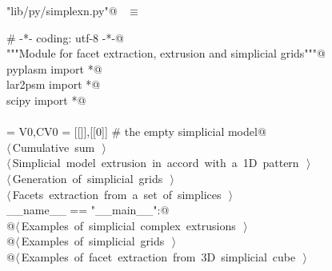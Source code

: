 \documentclass[11pt,oneside]{article}	%
\begin{document}
\begin{flushleft} \small
\begin{minipage}{\linewidth} \label{scrap10}
\verb@"lib/py/simplexn.py"@\nobreak\ {\footnotesize {} }$\equiv$
\vspace{-1ex}
\begin{list}{}{} \item
\mbox{}\verb@# -*- coding: utf-8 -*-@\\
\mbox{}\verb@"""Module for facet extraction, extrusion and simplicial grids"""@\\
\mbox{}\verb@from pyplasm import *@\\
\mbox{}\verb@from lar2psm import *@\\
\mbox{}\verb@from scipy import *@\\
\mbox{}\verb@@\\
\mbox{}\verb@VOID = V0,CV0 = [[]],[[0]]    # the empty simplicial model@\\
\mbox{}\verb@@\hbox{$\langle\,$Cumulative sum\nobreak\ {\footnotesize {}}$\,\rangle$}\verb@@\\
\mbox{}\verb@@\hbox{$\langle\,$Simplicial model extrusion in accord with a 1D pattern\nobreak\ {\footnotesize {}}$\,\rangle$}\verb@@\\
\mbox{}\verb@@\hbox{$\langle\,$Generation of simplicial grids\nobreak\ {\footnotesize {}}$\,\rangle$}\verb@@\\
\mbox{}\verb@@\hbox{$\langle\,$Facets extraction from a set of simplices\nobreak\ {\footnotesize {}}$\,\rangle$}\verb@@\\
\mbox{}\verb@if __name__ == "__main__":@\\
\mbox{}\verb@   @\hbox{$\langle\,$Examples of simplicial complex extrusions\nobreak\ {\footnotesize {}}$\,\rangle$}\verb@@\\
\mbox{}\verb@   @\hbox{$\langle\,$Examples of simplicial grids\nobreak\ {\footnotesize {}}$\,\rangle$}\verb@@\\
\mbox{}\verb@   @\hbox{$\langle\,$Examples of facet extraction from 3D simplicial cube\nobreak\ {\footnotesize {}}$\,\rangle$}\verb@@\\
\mbox{}\verb@@{\NWsep}
\end{list}
\vspace{-2ex}
\end{minipage}\\[4ex]
\end{flushleft}
\end{document}
